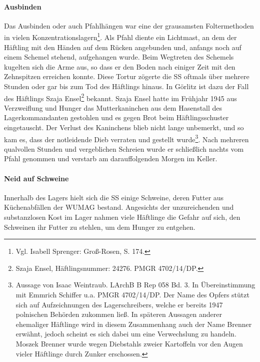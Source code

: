 \paragraph{Ausbinden}
Das Ausbinden oder auch Pfahlhängen war eine der grausamsten Foltermethoden in vielen Konzentrationslagern\footnote{Vgl. Isabell Sprenger: Groß-Rosen, S. 174.}. Als Pfahl diente ein Lichtmast, an dem der Häftling mit den Händen auf dem Rücken angebunden und, anfangs noch auf einem Schemel stehend, aufgehangen wurde. Beim Wegtreten des Schemels kugelten sich die Arme aus, so dass er den Boden nach einiger Zeit mit den Zehnspitzen erreichen konnte. Diese Tortur zögerte die SS oftmals über mehrere Stunden oder gar bis zum Tod des Häftlings hinaus.
\newline
In Görlitz ist dazu der Fall des Häftlings \mbox{Szaja} \mbox{Ensel}\footnote{Szaja Ensel, Häftlingsnummer: 24276. PMGR 4702/14/DP.} bekannt. Szaja Ensel hatte im Frühjahr 1945 aus Verzweiflung und Hunger das Mutterkaninchen aus dem Hasenstall des Lagerkommandanten gestohlen und es gegen Brot beim Häftlingsschuster eingetauscht. Der Verlust des Kaninchens blieb nicht lange unbemerkt, und so kam es, dass der notleidende Dieb verraten und gestellt wurde\footnote{Aussage von Isaac Weintraub. LArchB B Rep 058 Bd. 3. In Übereinstimmung mit Emmrich Schiffer u.a. PMGR 4702/14/DP. Der Name des Opfers stützt sich auf Aufzeichnungen des Lagerschreibers, welche er bereits 1947 polnischen Behörden zukommen ließ. In späteren Aussagen anderer ehemaliger Häftlinge wird in diesem Zusammenhang auch der Name Brenner erwähnt, jedoch scheint es sich dabei um eine Verwechslung zu handeln. Moszek Brenner wurde wegen Diebstahls zweier Kartoffeln vor den Augen vieler Häftlinge durch Zunker erschossen.}.
Nach mehreren qualvollen Stunden und vergeblichen Schreien wurde er schließlich nachts vom Pfahl genommen und verstarb am darauffolgenden Morgen im Keller.
~\newline

\paragraph{Neid auf Schweine}
\label{schweine}
Innerhalb des Lagers hielt sich die SS einige Schweine, deren Futter aus Küchenabfällen der WUMAG bestand. Angesichts der unzureichenden und substanzlosen Kost im Lager nahmen viele Häftlinge die Gefahr auf sich, den Schweinen ihr Futter zu stehlen, um dem Hunger zu entgehen.

